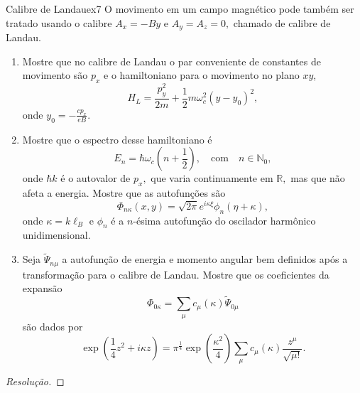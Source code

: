 \begin{exercício}{Calibre de Landau}{ex7}
    O movimento em um campo magnético pode também ser tratado usando o calibre \(A_x = - By\) e \(A_y = A_z = 0,\) chamado de calibre de Landau. 
    \begin{enumerate}[label=(\alph*)]
        \item Mostre que no calibre de Landau o par conveniente de constantes de movimento são \(p_x\) e o hamiltoniano para o movimento no plano \(xy\),
           \begin{equation*}
              H_L = \frac{p_y^2}{2m} + \frac12 m \omega_c^2 (y - y_0)^2,
           \end{equation*}
           onde \(y_0 = - \frac{cp_x}{eB}.\)
        \item Mostre que o espectro desse hamiltoniano é
           \begin{equation*}
              E_n = \hbar \omega_c \left(n + \frac12\right),\quad\text{com}\quad n \in \mathbb{N}_0,
           \end{equation*}
           onde \(\hbar k\) é o autovalor de \(p_x,\) que varia continuamente em \(\mathbb{R},\) mas que não afeta a energia. Mostre que as autofunções são
           \begin{equation*}
              \Phi_{n \kappa}(x,y) = \sqrt{2\pi} e^{i \kappa \xi} \phi_n(\eta + \kappa),
           \end{equation*}
           onde \(\kappa = k \ell_B\) e \(\phi_n\) é a \(n\)-ésima autofunção do oscilador harmônico unidimensional.
        \item Seja \(\tilde{\Psi}_{n \mu}\) a autofunção de energia e momento angular bem definidos após a transformação para o calibre de Landau. Mostre que os coeficientes da expansão
           \begin{equation*}
              \Phi_{0 \kappa} = \sum_{\mu} c_\mu(\kappa) \tilde{\Psi}_{0 \mu}
           \end{equation*}
           são dados por
           \begin{equation*}
              \exp\left(\frac14 z^2 + i \kappa z\right) = \pi^{\frac14} \exp\left(\frac{\kappa^2}{4}\right) \sum_{\mu} c_{\mu}(\kappa) \frac{z^\mu}{\sqrt{\mu!}}.
           \end{equation*}
    \end{enumerate}
\end{exercício}
\begin{proof}[Resolução]
    
\end{proof}
